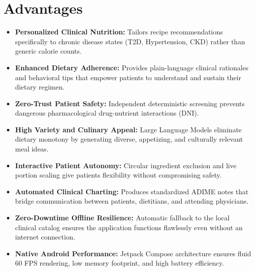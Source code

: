 \documentclass[a4paper,12pt]{report}
\begin{document}
\section{Advantages}
\begin{itemize}
\item \textbf{Personalized Clinical Nutrition:}
Tailors recipe recommendations specifically to chronic disease states (T2D, Hypertension, CKD) rather than generic calorie counts.

\item \textbf{Enhanced Dietary Adherence:}
Provides plain-language clinical rationales and behavioral tips that empower patients to understand and sustain their dietary regimen.

\item \textbf{Zero-Trust Patient Safety:}
Independent deterministic screening prevents dangerous pharmacological drug-nutrient interactions (DNI).

\item \textbf{High Variety and Culinary Appeal:}
Large Language Models eliminate dietary monotony by generating diverse, appetizing, and culturally relevant meal ideas.

\item \textbf{Interactive Patient Autonomy:}
Circular ingredient exclusion and live portion scaling give patients flexibility without compromising safety.

\item \textbf{Automated Clinical Charting:}
Produces standardized ADIME notes that bridge communication between patients, dietitians, and attending physicians.

\item \textbf{Zero-Downtime Offline Resilience:}
Automatic fallback to the local clinical catalog ensures the application functions flawlessly even without an internet connection.

\item \textbf{Native Android Performance:}
Jetpack Compose architecture ensures fluid 60 FPS rendering, low memory footprint, and high battery efficiency.
\end{itemize}
\end{document}
